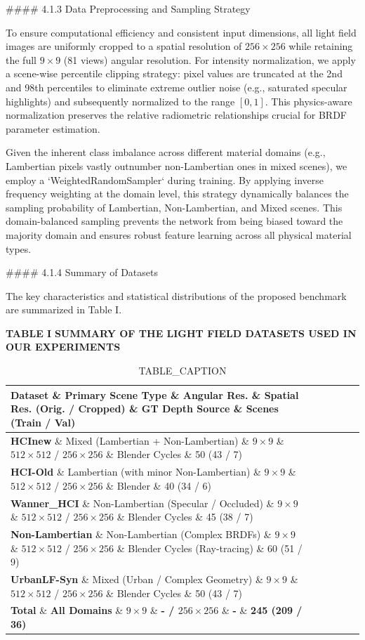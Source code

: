 \#\#\#\# 4.1.3 Data Preprocessing and Sampling Strategy

To ensure computational efficiency and consistent input dimensions, all light field images are uniformly cropped to a spatial resolution of \(256 \times 256\) while retaining the full \(9 \times 9\) (81 views) angular resolution. For intensity normalization, we apply a scene-wise percentile clipping strategy: pixel values are truncated at the 2nd and 98th percentiles to eliminate extreme outlier noise (e.g., saturated specular highlights) and subsequently normalized to the range \([0, 1]\). This physics-aware normalization preserves the relative radiometric relationships crucial for BRDF parameter estimation.

Given the inherent class imbalance across different material domains (e.g., Lambertian pixels vastly outnumber non-Lambertian ones in mixed scenes), we employ a `WeightedRandomSampler` during training. By applying inverse frequency weighting at the domain level, this strategy dynamically balances the sampling probability of Lambertian, Non-Lambertian, and Mixed scenes. This domain-balanced sampling prevents the network from being biased toward the majority domain and ensures robust feature learning across all physical material types.

\#\#\#\# 4.1.4 Summary of Datasets

The key characteristics and statistical distributions of the proposed benchmark are summarized in Table I.

\textbf{TABLE I}
\textbf{SUMMARY OF THE LIGHT FIELD DATASETS USED IN OUR EXPERIMENTS}

\begin{table}[htbp]
\centering
\caption{TABLE_CAPTION}
\begin{tabular}{llllll}
\toprule
Dataset \& Primary Scene Type \& Angular Res. \& Spatial Res. (Orig. / Cropped) \& GT Depth Source \& Scenes (Train / Val) \\
\midrule
\textbf{HCInew} \& Mixed (Lambertian + Non-Lambertian) \& \(9 \times 9\) \& \(512 \times 512\) / \(256 \times 256\) \& Blender Cycles \& 50 (43 / 7) \\
\textbf{HCI-Old} \& Lambertian (with minor Non-Lambertian) \& \(9 \times 9\) \& \(512 \times 512\) / \(256 \times 256\) \& Blender \& 40 (34 / 6) \\
\textbf{Wanner_HCI} \& Non-Lambertian (Specular / Occluded) \& \(9 \times 9\) \& \(512 \times 512\) / \(256 \times 256\) \& Blender Cycles \& 45 (38 / 7) \\
\textbf{Non-Lambertian} \& Non-Lambertian (Complex BRDFs) \& \(9 \times 9\) \& \(512 \times 512\) / \(256 \times 256\) \& Blender Cycles (Ray-tracing) \& 60 (51 / 9) \\
\textbf{UrbanLF-Syn} \& Mixed (Urban / Complex Geometry) \& \(9 \times 9\) \& \(512 \times 512\) / \(256 \times 256\) \& Blender Cycles \& 50 (43 / 7) \\
\textbf{Total} \& \textbf{All Domains} \& \textbf{\(9 \times 9\)} \& \textbf{- / \(256 \times 256\)} \& \textbf{-} \& \textbf{245 (209 / 36)} \\
\bottomrule
\end{tabular}
\end{table}
